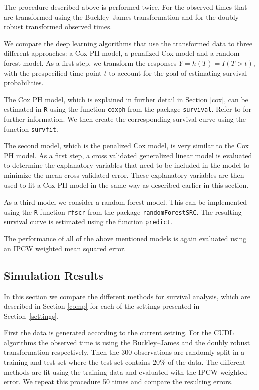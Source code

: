 \documentclass[12pt, a4paper]{scrartcl}
\theoremstyle{definition}
\theoremstyle{plain}
\numberwithin{equation}{section}
\numberwithin{figure}{section}
\numberwithin{table}{section}
\begin{document}
	The procedure described above is performed twice.
	For the observed times that are transformed using the Buckley--James transformation and for the doubly robust transformed observed times.
	
	We compare the deep learning algorithms that use the transformed data to three different approaches: a Cox PH model, a penalized Cox model and a random forest model.
	As a first step, we transform the responses $Y=h(T)=I(T>t)$, with the prespecified time point $t$ to account for the goal of estimating survival probabilities.
	
	The Cox PH model, which is explained in further detail in Section \ref{cox}, can be estimated in \texttt{R} using the function \texttt{coxph} from the package \texttt{survival}.
	Refer to \citet*{survival-package} for further information.
	We then create the corresponding survival curve using the function \texttt{survfit}.
	
	The second model, which is the penalized Cox model, is very similar to the Cox PH model.
	As a first step, a cross validated generalized linear model is evaluated to determine the explanatory variables that need to be included in the model to minimize the mean cross-validated error.
	These explanatory variables are then used to fit a Cox PH model in the same way as described earlier in this section.
	
	As a third model we consider a random forest model.
	This can be implemented using the \texttt{R} function \texttt{rfscr} from the package \texttt{randomForestSRC}.
	The resulting survival curve is estimated using the function \texttt{predict}.
	
	The performance of all of the above mentioned models is again evaluated using an IPCW weighted mean squared error.
	
	\subsection{Simulation Results}\label{seq:simresults}
	In this section we compare the different methods for survival analysis, which are described in Section \ref{comp}  for each of the settings presented in Section~\ref{settings}.
	
	First the data is generated according to the current setting.
	For the CUDL algorithms the observed time is using the Buckley--James and the doubly robust transformation respectively.
	Then the 300 observations are randomly split in a training and test set where the test set contains $20\%$ of the data.
	The different methods are fit using the training data and evaluated with the IPCW weighted error.
	We repeat this procedure 50 times and compare the resulting errors.
	
\end{document}
